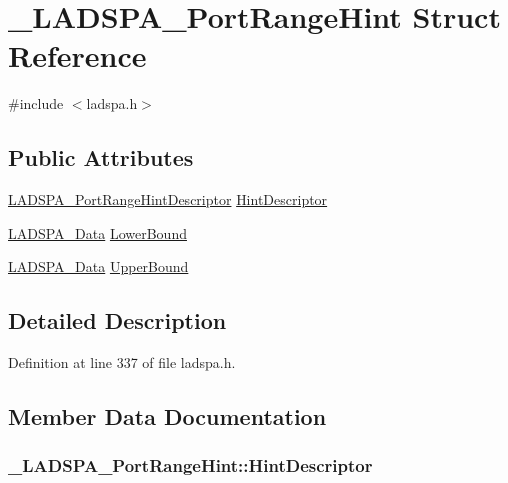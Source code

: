 \hypertarget{struct___l_a_d_s_p_a___port_range_hint}{}\section{\+\_\+\+L\+A\+D\+S\+P\+A\+\_\+\+Port\+Range\+Hint Struct Reference}
\label{struct___l_a_d_s_p_a___port_range_hint}


{\ttfamily \#include $<$ladspa.\+h$>$}

\subsection*{Public Attributes}
\begin{DoxyCompactItemize}
\item 
\hyperlink{src_2effects_2ladspa_2ladspa_8h_a713a427aa2ce55d37b4d00b81d04fbe4}{L\+A\+D\+S\+P\+A\+\_\+\+Port\+Range\+Hint\+Descriptor} \hyperlink{struct___l_a_d_s_p_a___port_range_hint_a38154a3a00789b50b02b0fec1bbf7b7b}{Hint\+Descriptor}
\item 
\hyperlink{src_2effects_2ladspa_2ladspa_8h_aad99c00d8bf98c0c147f2b38fad9e3ff}{L\+A\+D\+S\+P\+A\+\_\+\+Data} \hyperlink{struct___l_a_d_s_p_a___port_range_hint_ab4b6718d9f74733d7bf1fb93841b5e67}{Lower\+Bound}
\item 
\hyperlink{src_2effects_2ladspa_2ladspa_8h_aad99c00d8bf98c0c147f2b38fad9e3ff}{L\+A\+D\+S\+P\+A\+\_\+\+Data} \hyperlink{struct___l_a_d_s_p_a___port_range_hint_ac1a7985c27d0b976ce1f148024d5e363}{Upper\+Bound}
\end{DoxyCompactItemize}


\subsection{Detailed Description}


Definition at line 337 of file ladspa.\+h.



\subsection{Member Data Documentation}
\subsubsection[{\texorpdfstring{Hint\+Descriptor}{HintDescriptor}}]{ \+\_\+\+L\+A\+D\+S\+P\+A\+\_\+\+Port\+Range\+Hint\+::\+Hint\+Descriptor}\hypertarget{struct___l_a_d_s_p_a___port_range_hint_a38154a3a00789b50b02b0fec1bbf7b7b}{}\label{struct___l_a_d_s_p_a___port_range_hint_a38154a3a00789b50b02b0fec1bbf7b7b}


